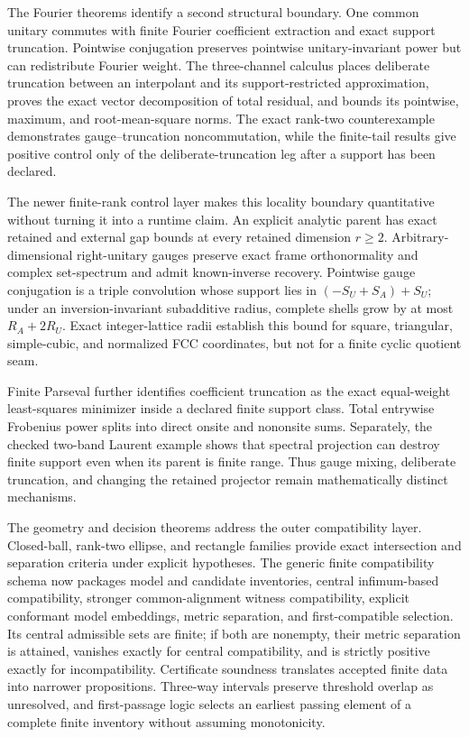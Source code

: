 The Fourier theorems identify a second structural boundary.  One common unitary
commutes with finite Fourier coefficient extraction and exact support truncation.
Pointwise conjugation preserves pointwise unitary-invariant power but can redistribute
Fourier weight.  The three-channel calculus places deliberate truncation between an
interpolant and its support-restricted approximation, proves the exact vector
decomposition of total residual, and bounds its pointwise, maximum, and root-mean-square
norms.  The exact rank-two counterexample demonstrates gauge--truncation
noncommutation, while the finite-tail results give positive control only of the
deliberate-truncation leg after a support has been declared.

The newer finite-rank control layer makes this locality boundary quantitative without
turning it into a runtime claim.  An explicit analytic parent has exact retained and
external gap bounds at every retained dimension $r\geq2$.  Arbitrary-dimensional right-unitary
gauges preserve exact frame orthonormality and complex set-spectrum and admit known-inverse
recovery.  Pointwise gauge conjugation is a triple convolution whose support lies in
$(-S_U+S_A)+S_U$; under an inversion-invariant subadditive radius, complete shells grow by
at most $R_A+2R_U$.  Exact integer-lattice radii establish this bound for square,
triangular, simple-cubic, and normalized FCC coordinates, but not for a finite cyclic
quotient seam.

Finite Parseval further identifies coefficient truncation as the exact equal-weight
least-squares minimizer inside a declared finite support class.  Total entrywise
Frobenius power splits into direct onsite and nononsite sums.  Separately, the checked
two-band Laurent example shows that spectral projection can destroy finite support even
when its parent is finite range.  Thus gauge mixing, deliberate truncation, and changing
the retained projector remain mathematically distinct mechanisms.

The geometry and decision theorems address the outer compatibility layer.  Closed-ball,
rank-two ellipse, and rectangle families provide exact intersection and separation
criteria under explicit hypotheses.  The generic finite compatibility schema now
packages model and candidate inventories, central infimum-based compatibility, stronger
common-alignment witness compatibility, explicit conformant model embeddings, metric
separation, and first-compatible selection.  Its central admissible sets are finite; if
both are nonempty, their metric separation is attained, vanishes exactly for central
compatibility, and is strictly positive exactly for incompatibility.  Certificate
soundness translates accepted finite data into narrower propositions.  Three-way
intervals preserve threshold overlap as unresolved, and first-passage logic selects an
earliest passing element of a complete finite inventory without assuming monotonicity.

